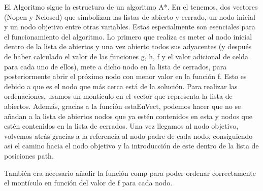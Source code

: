 El Algoritmo sigue la estructura de un algoritmo A*. En el tenemos, dos vectores (Nopen y Nclosed) que simbolizan las listas de abierto y cerrado, un nodo inicial y un nodo objetivo entre otras variables. Estas especialmente son esenciales para el funcionamiento del algoritmo. Lo primero que realiza es meter al nodo inicial dentro de la lista de abiertos y una vez abierto todos sus adyacentes (y después de haber calculado el valor de las funciones g, h, f y el valor adicional de celda para cada uno de ellos), mete a dicho nodo en la lista de cerrados, para posteriormente abrir el próximo nodo con menor valor en la función f. Esto es debido a que es el nodo que más cerca está de la solución. Para realizar las ordenaciones, usamos un montículo en el vector que representa la lista de abiertos. Además, gracias a la función estaEnVect, podemos hacer que no se añadan a la lista de abiertos nodos que ya estén contenidos en esta y nodos que estén contenidos en la lista de cerrados. Una vez llegamos al nodo objetivo, volvemos atrás gracias a la referencia al nodo padre de cada nodo, consiguiendo así el camino hacia el nodo objetivo y la introducción de este dentro de la lista de posiciones path.

También era necesario añadir la función comp para poder ordenar correctamente el montículo en función del valor de f para cada nodo.
